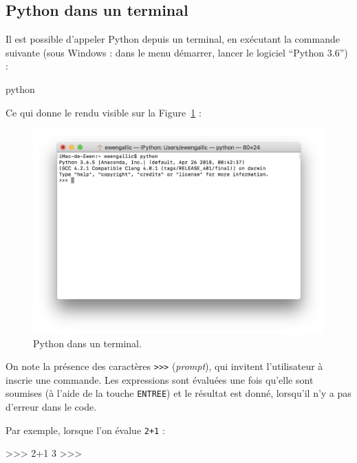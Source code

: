 \documentclass[
  12pt,
]{book}
\newenvironment{Shaded}{\begin{snugshade}}{\end{snugshade}}
\newcommand{\NormalTok}[1]{#1}
\numberwithin{equation}{section}
\numberwithin{countremarque}{section}
\begin{document}
\subsection{Python dans un terminal}\label{python-dans-un-terminal}

Il est possible d'appeler Python depuis un terminal, en exécutant la commande suivante (sous Windows : dans le menu démarrer, lancer le logiciel ``Python 3.6'') :

\begin{Shaded}
\begin{Highlighting}[]
\NormalTok{python}
\end{Highlighting}
\end{Shaded}

Ce qui donne le rendu visible sur la Figure~\ref{fig:intro-python-terminal} :

\begin{figure}[H]

{\centering \includegraphics[width=0.7\linewidth]{figs/python_terminal} 

}

\caption{Python dans un terminal.}\label{fig:intro-python-terminal}
\end{figure}

On note la présence des caractères \texttt{\textgreater{}\textgreater{}\textgreater{}} (\emph{prompt}), qui invitent l'utilisateur à inscrie une commande. Les expressions sont évaluées une fois qu'elle sont soumises (à l'aide de la touche \texttt{ENTREE}) et le résultat est donné, lorsqu'il n'y a pas d'erreur dans le code.

Par exemple, lorsque l'on évalue \texttt{2+1} :

\begin{Shaded}
\begin{Highlighting}[]
\NormalTok{\textgreater{}\textgreater{}\textgreater{} 2+1}
\NormalTok{3}
\NormalTok{\textgreater{}\textgreater{}\textgreater{}}
\end{Highlighting}
\end{Shaded}
\end{document}
